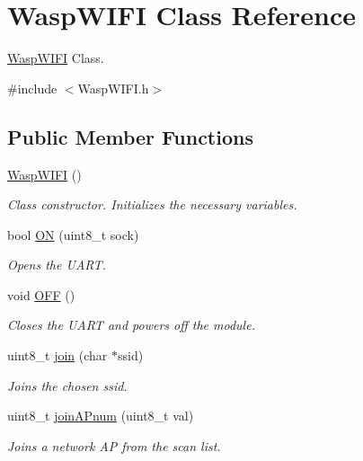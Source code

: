 \hypertarget{class_wasp_w_i_f_i}{}\section{Wasp\+W\+I\+FI Class Reference}
\label{class_wasp_w_i_f_i}


\hyperlink{class_wasp_w_i_f_i}{Wasp\+W\+I\+FI} Class.  




{\ttfamily \#include $<$Wasp\+W\+I\+F\+I.\+h$>$}

\subsection*{Public Member Functions}
\begin{DoxyCompactItemize}
\item 
\hyperlink{class_wasp_w_i_f_i_ac890dc3d2e39ca762d65b68f88beb386}{Wasp\+W\+I\+FI} ()
\begin{DoxyCompactList}\small\item\em Class constructor. Initializes the necessary variables. \end{DoxyCompactList}\item 
bool \hyperlink{class_wasp_w_i_f_i_aa4e8b8b9cc2ee8350515ce6aa6bdb6bb}{ON} (uint8\+\_\+t sock)
\begin{DoxyCompactList}\small\item\em Opens the U\+A\+RT. \end{DoxyCompactList}\item 
void \hyperlink{class_wasp_w_i_f_i_a758d72a782c36343552e9a8394ae2614}{O\+FF} ()
\begin{DoxyCompactList}\small\item\em Closes the U\+A\+RT and powers off the module. \end{DoxyCompactList}\item 
uint8\+\_\+t \hyperlink{class_wasp_w_i_f_i_abd0d95e039f21a1abd3f72bab8fae3ba}{join} (char $\ast$ssid)
\begin{DoxyCompactList}\small\item\em Joins the chosen ssid. \end{DoxyCompactList}\item 
uint8\+\_\+t \hyperlink{class_wasp_w_i_f_i_ab5fc134ae4e98d1be4daa10dc65e7c1d}{join\+A\+Pnum} (uint8\+\_\+t val)
\begin{DoxyCompactList}\small\item\em Joins a network AP from the scan list. \end{DoxyCompactList}\item 

\end{DoxyCompactItemize}
